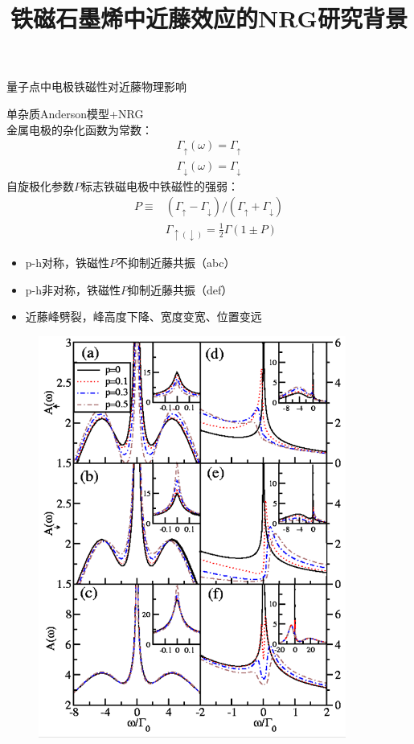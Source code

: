 \documentclass[9pt,t]{beamer} %
\begin{document}
\title{铁磁石墨烯中近藤效应的NRG研究\qquad \qquad \qquad \qquad 背景}
\begin{frame}{量子点中电极铁磁性对近藤物理影响}
\begin{minipage}[t]{0.55 \textwidth}
单杂质Anderson模型+NRG\\
金属电极的杂化函数为常数：
\[
\begin{array}{l}{\Gamma_{\uparrow}(\omega)=\Gamma_{\uparrow}} \\ {\Gamma_{\downarrow}(\omega)=\Gamma_{\downarrow}}\end{array}
\]
自旋极化参数$P$标志铁磁电极中铁磁性的强弱：
\[
\begin{aligned} P \equiv &\left(\Gamma_{\uparrow}-\Gamma_{\downarrow}\right) /\left(\Gamma_{\uparrow}+\Gamma_{\downarrow}\right) \\ & \Gamma_{\uparrow(\downarrow)}=\frac{1}{2} \Gamma(1 \pm P) \end{aligned}
\]
\begin{itemize}
\item p-h对称，铁磁性$P$不抑制近藤共振（abc）
\item p-h非对称，铁磁性$P$抑制近藤共振（def）
\item 近藤峰劈裂，峰高度下降、宽度变宽、位置变远
\end{itemize}
\vspace{0.3cm}
\end{minipage}%
\begin{minipage}[t]{0.5 \textwidth}
\vspace{-0.3cm}
\begin{figure}
\includegraphics[width=0.9\textwidth]{Aw-P.png}

\end{figure}
\end{minipage}
\end{frame}
\end{document}
